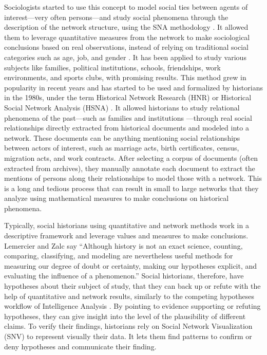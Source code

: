Sociologists started to use this concept to model social ties between agents of interest---very often persons---and study social phenomena through the description of the network structure, using the SNA methodology \cite{wassermanSocialNetworkAnalysis1994}.
It allowed them to leverage quantitative measures from the network to make sociological conclusions based on real observations, instead of relying on traditional social categories such as age, job, and gender \cite{freemanDevelopmentSocialNetwork2004}.
It has been applied to study various subjects like families, political institutions, schools, friendships, work environments, and sports clubs, with promising results.
This method grew in popularity in recent years and has started to be used and formalized by historians in the 1980s, under the term Historical Network Research (HNR) or Historical Social Network Analysis (HSNA) \cite{wetherellHistoricalSocialNetwork1998}.
It allowed historians to study relational phenomena of the past---such as families and institutions ---through real social relationships directly extracted from historical documents and modeled into a network.
These documents can be anything mentioning social relationships between actors of interest, such as marriage acts, birth certificates, census, migration acts, and work contracts.
After selecting a corpus of documents (often extracted from archives), they manually annotate each document to extract the mentions of persons along their relationships to model those with a network.
This is a long and tedious process that can result in small to large networks that they analyze using mathematical measures to make conclusions on historical phenomena.

Typically, social historians using quantitative and network methods work in a descriptive framework and leverage values and measures to make conclusions.
Lemercier and Zalc say ``Although history is not an exact science, counting, comparing, classifying, and modeling are nevertheless useful methods for measuring our degree of doubt or certainty, making our hypotheses explicit, and evaluating the influence of a phenomenon.'' \cite{lemercierQuantitativeMethodsHumanities2019}
Social historians, therefore, have hypotheses about their subject of study, that they can back up or refute with the help of quantitative and network results, similarly to the competing hypotheses workflow of Intelligence Analysis \cite{dhamiAnalysisCompetingHypotheses2019}.
By pointing to evidence supporting or refuting hypotheses, they can give insight into the level of the plausibility of different claims.
To verify their findings, historians rely on Social Network Visualization (SNV) to represent visually their data.
It lets them find patterns to confirm or deny hypotheses and communicate their finding.


